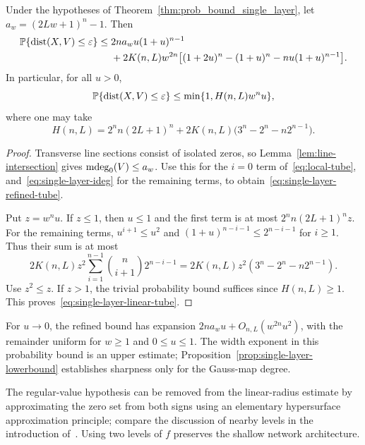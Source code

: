 \begin{corollary}\label{cor:single-layer-tight-prob-bound}
Under the hypotheses of Theorem~\ref{thm:prob_bound_single_layer}, let $a_w=(2Lw+1)^n-1$. Then
\begin{align}
\operatorname*{\mathbb{P}}\{\operatorname{dist}(X,V)\le\varepsilon\}\le{}&
2na_wu(1+u)^{n-1}\nonumber\\
&+2K(n,L)w^{2n}
\bigl[(1+2u)^n-(1+u)^n-nu(1+u)^{n-1}\bigr].
\label{eq:single-layer-refined-tube}
\end{align}
In particular, for all $u>0$,
\begin{equation}\label{eq:single-layer-linear-tube}
\operatorname*{\mathbb{P}}\{\operatorname{dist}(X,V)\le\varepsilon\}
\le\min\{1,H(n,L)w^nu\},
\end{equation}
where one may take
\begin{equation}\label{eq:single-layer-H}
H(n,L)=2^nn(2L+1)^n+
2K(n,L)\bigl(3^n-2^n-n2^{n-1}\bigr).
\end{equation}
\end{corollary}

\begin{proof}
Transverse line sections consist of isolated zeros, so Lemma~\ref{lem:line-intersection} gives $\operatorname{\mathrm{mdeg}}_0(V)\le a_w$. Use this for the $i=0$ term of~\eqref{eq:local-tube}, and~\eqref{eq:single-layer-ideg} for the remaining terms, to obtain~\eqref{eq:single-layer-refined-tube}.

Put $z=w^nu$. If $z\le1$, then $u\le1$ and the first term is at most $2^nn(2L+1)^nz$. For the remaining terms, $u^{i+1}\le u^2$ and $(1+u)^{n-i-1}\le2^{n-i-1}$ for $i\ge1$. Thus their sum is at most
\[
2K(n,L)z^2
\sum_{i=1}^{n-1}\binom n{i+1}2^{n-i-1}
=2K(n,L)z^2(3^n-2^n-n2^{n-1}).
\]
Use $z^2\le z$. If $z>1$, the trivial probability bound suffices since $H(n,L)\ge1$. This proves~\eqref{eq:single-layer-linear-tube}.
\end{proof}

For $u\to0$, the refined bound has expansion $2na_wu+O_{n,L}(w^{2n}u^2)$, with the remainder uniform for $w\ge1$ and $0\le u\le1$. The width exponent in this probability bound is an upper estimate; Proposition~\ref{prop:single-layer-lowerbound} establishes sharpness only for the Gauss-map degree.

The regular-value hypothesis can be removed from the linear-radius estimate by approximating the zero set from both signs using an elementary hypersurface approximation principle; compare the discussion of nearby levels in the introduction of~\cite{basu2021hausdorff}. Using two levels of $f$ preserves the shallow network architecture.

